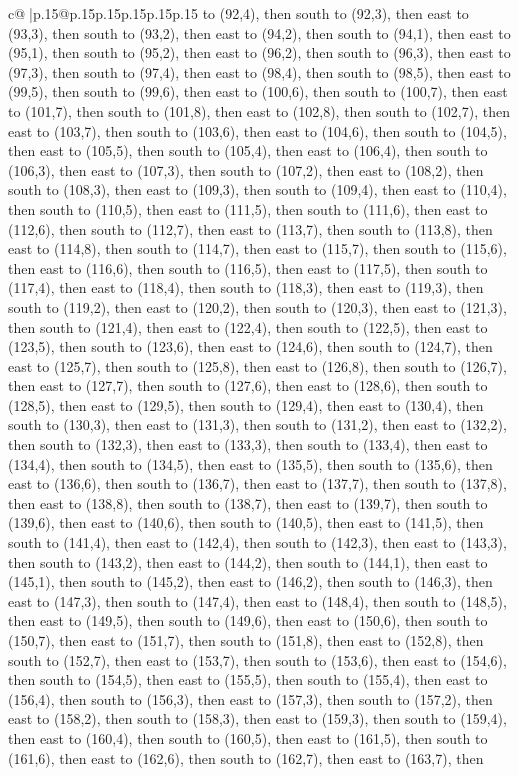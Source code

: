 \documentclass{article}
\begin{document}
{\begin{supertabular}{c@{$\;$}|p{.15\linewidth}@{}p{.15\linewidth}p{.15\linewidth}p{.15\linewidth}p{.15\linewidth}p{.15\linewidth}}
{{{to (92,4), then south to (92,3), then east to (93,3), then south to (93,2), then east to (94,2), then south to (94,1), then east to (95,1), then south to (95,2), then east to (96,2), then south to (96,3), then east to (97,3), then south to (97,4), then east to (98,4), then south to (98,5), then east to (99,5), then south to (99,6), then east to (100,6), then south to (100,7), then east to (101,7), then south to (101,8), then east to (102,8), then south to (102,7), then east to (103,7), then south to (103,6), then east to (104,6), then south to (104,5), then east to (105,5), then south to (105,4), then east to (106,4), then south to (106,3), then east to (107,3), then south to (107,2), then east to (108,2), then south to (108,3), then east to (109,3), then south to (109,4), then east to (110,4), then south to (110,5), then east to (111,5), then south to (111,6), then east to (112,6), then south to (112,7), then east to (113,7), then south to (113,8), then east to (114,8), then south to (114,7), then east to (115,7), then south to (115,6), then east to (116,6), then south to (116,5), then east to (117,5), then south to (117,4), then east to (118,4), then south to (118,3), then east to (119,3), then south to (119,2), then east to (120,2), then south to (120,3), then east to (121,3), then south to (121,4), then east to (122,4), then south to (122,5), then east to (123,5), then south to (123,6), then east to (124,6), then south to (124,7), then east to (125,7), then south to (125,8), then east to (126,8), then south to (126,7), then east to (127,7), then south to (127,6), then east to (128,6), then south to (128,5), then east to (129,5), then south to (129,4), then east to (130,4), then south to (130,3), then east to (131,3), then south to (131,2), then east to (132,2), then south to (132,3), then east to (133,3), then south to (133,4), then east to (134,4), then south to (134,5), then east to (135,5), then south to (135,6), then east to (136,6), then south to (136,7), then east to (137,7), then south to (137,8), then east to (138,8), then south to (138,7), then east to (139,7), then south to (139,6), then east to (140,6), then south to (140,5), then east to (141,5), then south to (141,4), then east to (142,4), then south to (142,3), then east to (143,3), then south to (143,2), then east to (144,2), then south to (144,1), then east to (145,1), then south to (145,2), then east to (146,2), then south to (146,3), then east to (147,3), then south to (147,4), then east to (148,4), then south to (148,5), then east to (149,5), then south to (149,6), then east to (150,6), then south to (150,7), then east to (151,7), then south to (151,8), then east to (152,8), then south to (152,7), then east to (153,7), then south to (153,6), then east to (154,6), then south to (154,5), then east to (155,5), then south to (155,4), then east to (156,4), then south to (156,3), then east to (157,3), then south to (157,2), then east to (158,2), then south to (158,3), then east to (159,3), then south to (159,4), then east to (160,4), then south to (160,5), then east to (161,5), then south to (161,6), then east to (162,6), then south to (162,7), then east to (163,7), then }}}
\end{supertabular}}
\end{document}
